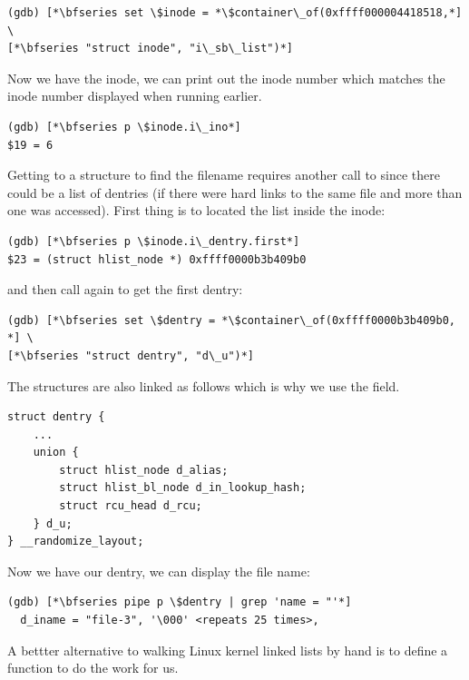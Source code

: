 \begin{lstlisting}
(gdb) [*\bfseries set \$inode = *\$container\_of(0xffff000004418518,*] \
[*\bfseries "struct inode", "i\_sb\_list")*]
\end{lstlisting}

\noindent
Now we have the inode, we can print out the inode number which matches the inode number displayed when running  earlier.

\begin{lstlisting}
(gdb) [*\bfseries p \$inode.i\_ino*]
$19 = 6
\end{lstlisting}

\noindent
Getting to a  structure to find the filename requires another call to  since there could be a list of dentries (if there were hard links to the same file and more than one was accessed). First thing is to located the list inside the inode:

\begin{lstlisting}
(gdb) [*\bfseries p \$inode.i\_dentry.first*]
$23 = (struct hlist_node *) 0xffff0000b3b409b0
\end{lstlisting}

\noindent
and then call  again to get the first dentry:

\begin{lstlisting}
(gdb) [*\bfseries set \$dentry = *\$container\_of(0xffff0000b3b409b0, *] \
[*\bfseries "struct dentry", "d\_u")*]
\end{lstlisting}

\noindent
The  structures are also linked as follows which is why we use the  field.

\begin{lstlisting}
struct dentry {
    ...
    union {
        struct hlist_node d_alias;  
        struct hlist_bl_node d_in_lookup_hash;  
        struct rcu_head d_rcu;
    } d_u;
} __randomize_layout;
\end{lstlisting}

\noindent
Now we have our dentry, we can display the file name:

\begin{lstlisting}
(gdb) [*\bfseries pipe p \$dentry | grep 'name = "'*]
  d_iname = "file-3", '\000' <repeats 25 times>,
\end{lstlisting}

\noindent
A bettter alternative to walking Linux kernel linked lists by hand is to define a  function to do the work for us.


